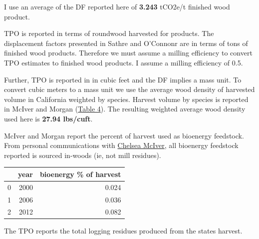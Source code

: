 \documentclass[a4paper]{article}
\begin{document}
I use an average of the DF reported here of \textbf{3.243} tCO2e/t finished
wood product.

TPO is reported in terms of roundwood harvested for products. The
displacement factors presented in Sathre and O'Connonr are in terms of
tons of finished wood products. Therefore we must assume a milling
efficiency to convert TPO estimates to finished wood products. I assume
a milling efficiency of 0.5.

Further, TPO is reported in in cubic feet and the DF implies a mass
unit. To convert cubic meters to a mass unit we use the average wood
density of harvested volume in California weighted by species. Harvest
volume by species is reported in McIver and Morgan
(\href{https://docs.google.com/spreadsheets/d/138FWlGeW57MKdcz2UkWxtWV4o50SZO8sduB1R6JOFp8/pubhtml?gid=393414465&single=true}{Table
4}). The resulting weighted average wood density used here is \textbf{27.94
lbs/cuft}.

McIver and Morgan report the percent of harvest used as bioenergy
feedstock. From personal communications with
\href{http://www.bber.umt.edu/staff/mciver.asp}{Chelsea McIver}, all
bioenergy feedstock reported is sourced in-woods (ie, not mill
residues).

\begin{center}
\begin{tabular}{rrr}
 & year & bioenergy \% of harvest\\
\hline
0 & 2000 & 0.024\\
1 & 2006 & 0.036\\
2 & 2012 & 0.082\\
\end{tabular}

\end{center}

The TPO reports the total logging residues produced from the states
harvest.
\end{document}

